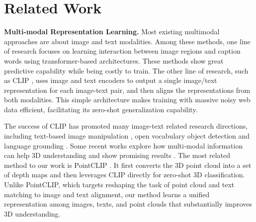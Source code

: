 \documentclass[10pt,twocolumn,letterpaper]{article}
\begin{document}
\section{Related Work}
\label{sec:related work}
\noindent\textbf{Multi-modal Representation Learning.}
Most existing multimodal approaches are about image and text modalities. 
Among these methods, one line of research focuses on learning interaction between image regions and caption words \cite{tan2019lxmert,chen2020uniter,li2020oscar,lu2019vilbert,li2019visualbert,li2021align} using transformer-based architectures. These methods show great predictive capability while being costly to train. 
The other line of research, such as CLIP \cite{radford2021learning}, uses image and text encoders to output a single image/text representation for each image-text pair, and then aligns the representations from both modalities. This simple architecture makes training with massive noisy web data efficient, facilitating its zero-shot generalization capability.

The success of CLIP has promoted many image-text related research directions, including text-based image manipulation \cite{patashnik2021styleclip}, open vocabulary object detection \cite{gu2021open,gao2021towards} and language grounding \cite{li2022grounded}. Some recent works explore how multi-modal information can help 3D understanding and show promising results \cite{yan2022let, chen2021multimodal}. The most related method to our work is PointCLIP \cite{zhang2022pointclip}. It first converts the 3D point cloud into a set of depth maps and then leverages CLIP directly for zero-shot 3D classification. Unlike PointCLIP, which targets reshaping the task of point cloud and text matching to image and text alignment, our method learns a unified representation among images, texts, and point clouds that substantially improves 3D understanding.
\end{document}
